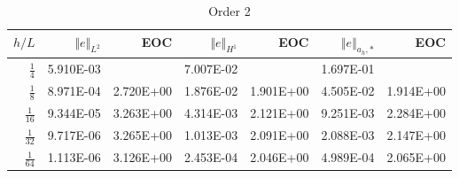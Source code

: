 \documentclass[landscape,a4paper]{article}
\begin{document}
\begin{table}[htbp]
  \begin{tabular}{rrrrrrr}
    \hline\hline
    \textbf{$h/{L}$} & \textbf{$\Vert e \Vert_{L^2}$} & \textbf{EOC} & \textbf{$ \Vert e \Vert_{H^1}$} & \textbf{EOC} & \textbf{$\Vert e \Vert_{ a_h,* }$} & \textbf{EOC} \\\hline
    $\frac{1}{4}$ & 5.910E-03 &  & 7.007E-02 &  & 1.697E-01 &  \\
    $\frac{1}{8}$ & 8.971E-04 & 2.720E+00 & 1.876E-02 & 1.901E+00 & 4.505E-02 & 1.914E+00 \\
    $\frac{1}{16}$ & 9.344E-05 & 3.263E+00 & 4.314E-03 & 2.121E+00 & 9.251E-03 & 2.284E+00 \\
    $\frac{1}{32}$ & 9.717E-06 & 3.265E+00 & 1.013E-03 & 2.091E+00 & 2.088E-03 & 2.147E+00 \\
    $\frac{1}{64}$ & 1.113E-06 & 3.126E+00 & 2.453E-04 & 2.046E+00 & 4.989E-04 & 2.065E+00 \\\hline\hline
  \end{tabular}
    \caption{Order 2}
\end{table}

\end{document}
